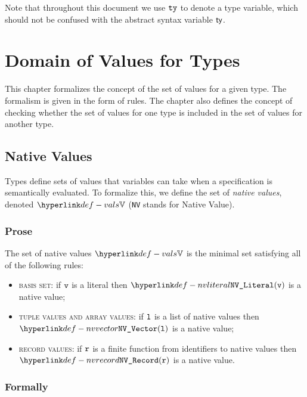 \documentclass{book}
\begin{document}
Note that throughout this document we use $\texttt{ty}$ to denote a type variable, which should not be confused with the abstract syntax variable $\textsf{ty}$.

\chapter{Domain of Values for Types}
This chapter formalizes the concept of the set of values for a given type.
The formalism is given in the form of rules.
%
The chapter also defines the concept of checking whether the set of values
for one type is included in the set of values for another type.

\hypertarget{def-vals}{}
\section{Native Values \label{sec:nativevalues}}

Types define sets of values that variables can take when a specification is semantically evaluated.
To formalize this, we define the set of \emph{native values}, denoted $\vals$
(\texttt{NV} stands for Native Value).

\subsection{Prose}
The set of native values $\vals$ is the minimal set satisfying all of the following rules:
\begin{itemize}
  \item \textsc{basis set}: if $\texttt{v}$ is a literal then $\nvliteral{\vv}$ is a native value;
  \item \textsc{tuple values and array values}: if $\texttt{l}$ is a list of native values then $\nvvector{\vl}$ is a native value;
  \item \textsc{record values}: if $\texttt{r}$ is a finite function from identifiers to native values then $\nvrecord{\vr}$ is a native value.
\end{itemize}

\subsection{Formally}
\hypertarget{def-nvliteral}{}
\hypertarget{def-nvvector}{}
\hypertarget{def-nvrecord}{}
\end{document}

